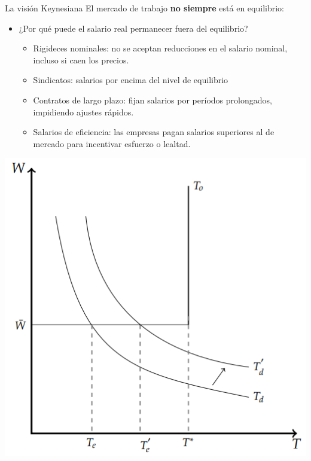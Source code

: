 \documentclass{beamer}
\begin{document}
\begin{frame}{La visión Keynesiana}
    \small
    El mercado de trabajo \textbf{no siempre} está en equilibrio:
    \begin{itemize}
        \item ¿Por qué puede el salario real permanecer fuera del equilibrio?
        \begin{itemize}
            \item Rigideces nominales: no se aceptan reducciones en el salario nominal, incluso si caen los precios.
            \item Sindicatos: salarios por encima del nivel de equilibrio
            \item Contratos de largo plazo: fijan salarios por períodos prolongados, impidiendo ajustes rápidos.
            \item Salarios de eficiencia: las empresas pagan salarios superiores al de mercado para incentivar esfuerzo o lealtad.
       \end{itemize}
    \end{itemize}
    \centering
    \includegraphics[scale=0.4]{../Figures/C34.7.png}
\end{frame}
\end{document}
